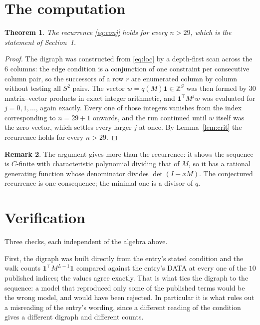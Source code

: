 \documentclass[11pt,a4paper]{article}
\theoremstyle{plain}
\newtheorem{theorem}{Theorem}
\theoremstyle{definition}
\newtheorem{remark}[theorem]{Remark}
\begin{document}
\section{The computation}

\begin{theorem}
The recurrence \eqref{eq:conj} holds for every $n>29$, which is the statement of
Section~1.
\end{theorem}

\begin{proof}
The digraph was constructed from \eqref{eq:loc} by a depth-first scan across the $6$
columns: the edge condition is a conjunction of one constraint per consecutive column
pair, so the successors of a row $r$ are enumerated column by column without testing all
$S^2$ pairs. The vector $w=q(M)\mathbf{1}\in\mathbb{Z}^{S}$ was then formed by $30$
matrix--vector products in exact integer arithmetic, and $\mathbf{1}^{\!\top}M^{j}w$ was
evaluated for $j=0,1,\dots$, again exactly. Every one of those integers vanishes from the
index corresponding to $n=29+1$ onwards, and the run continued until $w$ itself was the
zero vector, which settles every larger $j$ at once. By Lemma~\ref{lem:crit} the recurrence
holds for every $n>29$.
\end{proof}

\begin{remark}
The argument gives more than the recurrence: it shows the sequence is $C$-finite with
characteristic polynomial dividing that of $M$, so it has a rational generating function
whose denominator divides $\det(I-xM)$. The conjectured recurrence is one consequence; the
minimal one is a divisor of $q$.
\end{remark}

\section{Verification}

Three checks, each independent of the algebra above.

First, the digraph was built directly from the entry's stated condition and the walk counts
$\mathbf{1}^{\!\top}M^{L-1}\mathbf{1}$ compared against the entry's DATA at
every one of the $10$ published indices; the values agree exactly. That is what ties
the digraph to the sequence: a model that reproduced only some of the published terms would
be the wrong model, and would have been rejected. In particular it is what rules out a
misreading of the entry's wording, since a different reading of the condition gives a
different digraph and different counts.
\end{document}
